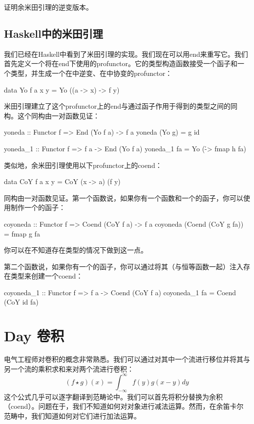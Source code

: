 \documentclass[DaoFP]{subfiles}
\begin{document}
\begin{exercise}
证明余米田引理的逆变版本。
\end{exercise}

\subsection{Haskell中的米田引理}

我们已经在Haskell中看到了米田引理的实现。我们现在可以用end来重写它。我们首先定义一个将在end下使用的profunctor。它的类型构造函数接受一个函子和一个类型，并生成一个在中逆变、在中协变的profunctor：
\begin{haskell}
data Yo f a x y = Yo ((a -> x) -> f y)
\end{haskell}
米田引理建立了这个profunctor上的end与通过函子作用于得到的类型之间的同构。这个同构由一对函数见证：
\begin{haskell}
yoneda :: Functor f => End (Yo f a) -> f a
yoneda (Yo g) = g id

yoneda_1 :: Functor f => f a -> End (Yo f a)
yoneda_1 fa = Yo (\h -> fmap h fa)
\end{haskell}

类似地，余米田引理使用以下profunctor上的coend：
\begin{haskell}
data CoY f a x y = CoY (x -> a) (f y)
\end{haskell}
同构由一对函数见证。第一个函数说，如果你有一个函数和一个的函子，你可以使用制作一个的函子：
\begin{haskell}
coyoneda :: Functor f => Coend (CoY f a) -> f a
coyoneda (Coend (CoY g fa)) = fmap g fa
\end{haskell}
你可以在不知道存在类型的情况下做到这一点。

第二个函数说，如果你有一个的函子，你可以通过将其（与恒等函数一起）注入存在类型来创建一个coend：
\begin{haskell}
coyoneda_1 :: Functor f => f a -> Coend (CoY f a)
coyoneda_1 fa = Coend (CoY id fa)
\end{haskell}

\section{Day 卷积}

电气工程师对卷积的概念非常熟悉。我们可以通过对其中一个流进行移位并将其与另一个流的乘积求和来对两个流进行卷积：
\[ (f \star g)(x) = \int^{\infty}_{-\infty} f(y) g(x - y) dy \]
这个公式几乎可以逐字翻译到范畴论中。我们可以首先将积分替换为余积（coend）。问题在于，我们不知道如何对对象进行减法运算。然而，在余笛卡尔范畴中，我们知道如何对它们进行加法运算。
\end{document}
